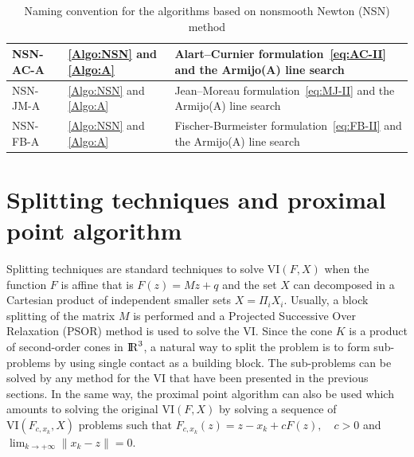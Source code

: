 \begin{table}[htbp]
\begin{tabular}{|l|l|p{}|}
    \\
    \hline
    \sf NSN-AC-A
    & \ref{Algo:NSN} and \ref{Algo:A}
    &  Alart--Curnier formulation~\eqref{eq:AC-II} and the Armijo(A) line search
    \\
    \hline
    \sf NSN-JM-A
    & \ref{Algo:NSN} and \ref{Algo:A}
    & Jean--Moreau formulation~\eqref{eq:MJ-II} and the Armijo(A) line search
    \\
    \hline
    \sf NSN-FB-A
    & \ref{Algo:NSN} and \ref{Algo:A}
    & Fischer-Burmeister formulation~\eqref{eq:FB-II} and the Armijo(A) line search
    \\
    \hline
  \end{tabular}
  \caption{Naming convention for the algorithms based on nonsmooth Newton (NSN) method}
  \label{tab:NSN-algos}
\end{table}





\clearpage
\section{Splitting techniques and proximal point algorithm}
\label{Sec:SplittingTechniquesAndProx}

Splitting techniques are standard techniques to solve $\mathrm{VI}(F,X)$ when the function $F$ is affine that is $F(z) = Mz+q$ and the set $X$ can decomposed in a Cartesian product of independent smaller sets $X = \Pi_{i} X_i$.
Usually, a block splitting of the matrix $M$ is performed and a Projected Successive Over Relaxation (PSOR) method is used to solve the VI. Since the cone $K$ is a product of second-order cones in $\mathrm{I\!R}^3$, a natural way to split the problem is to form sub-problems by using single contact as a building block. The sub-problems can be solved by any method for the VI that have been presented in the previous sections. In the same way, the proximal point algorithm can also be used which amounts to solving the original $\mathrm{VI}(F,X)$ by solving a sequence of $\mathrm{VI}(F_{c,x_k},X)$  problems such that $  F_{c,x_k}(z) = z - x_k + c F(z) , \quad c > 0$ and $\lim_ {k \rightarrow +\infty } \|x_k-z\| =0$.


